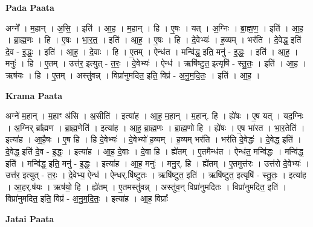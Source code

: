 \documentclass[17pt]{extarticle}
\begin{document}
\textbf{Pada Paata} \newline

अग्ने᳚ । म॒हान् । अ॒सि॒ । इति॑ । आ॒ह॒ । म॒हान् । हि । ए॒षः । यत् । अ॒ग्निः । ब्रा॒ह्म॒ण॒ । इति॑ । आ॒ह॒ । ब्रा॒ह्म॒णः । हि । ए॒षः । भा॒र॒त॒ । इति॑ । आ॒ह॒ । ए॒षः । हि । दे॒वेभ्यः॑ । ह॒व्यम् । भर॑ति । दे॒वेद्ध॒ इति॑ दे॒व - इ॒द्धः॒ । इति॑ । आ॒ह॒ । दे॒वाः । हि । ए॒तम् । ऐन्ध॑त । मन्वि॑द्ध॒ इति॒ मनु॑ - इ॒द्धः॒ । इति॑ । आ॒ह॒ । मनुः॑ । हि । ए॒तम् । उत्त॑र॒ इत्युत् - त॒रः॒ । दे॒वेभ्यः॑ । ऐन्ध॑ । ऋषि॑ष्टुत॒ इत्यृषि॑ - स्तु॒तः॒ । इति॑ । आ॒ह॒ । ऋष॑यः । हि । ए॒तम् । अस्तु॑वन्न् । विप्रा॑नुमदित॒ इति॒ विप्र॑ - अ॒नु॒म॒दि॒तः॒ । इति॑ । आ॒ह॒ ।  \newline


\textbf{Krama Paata} \newline

अग्ने॑ म॒हान् । म॒हाꣳ अ॑सि । अ॒सीति॑ । इत्या॑ह । आ॒ह॒ म॒हान् । म॒हान्. हि । ह्ये॑षः । ए॒ष यत् । यद॒ग्निः । अ॒ग्निर् ब्रा᳚ह्मण । ब्रा॒ह्म॒णेति॑ । इत्या॑ह । आ॒ह॒ ब्रा॒ह्म॒णः । ब्रा॒ह्म॒णो हि । ह्ये॑षः । ए॒ष भा॑रत । भा॒र॒तेति॑ । इत्या॑ह । आ॒है॒षः । ए॒ष हि । हि दे॒वेभ्यः॑ । दे॒वेभ्यो॑ ह॒व्यम् । ह॒व्यम् भर॑ति । भर॑ति दे॒वेद्धः॑ । दे॒वेद्ध॒ इति॑ । दे॒वेद्ध॒ इति॑ दे॒व - इ॒द्धः॒ । इत्या॑ह । आ॒ह॒ दे॒वाः । दे॒वा हि । ह्ये॑तम् । ए॒तमैन्ध॑त । ऐन्ध॑त॒ मन्वि॑द्धः । मन्वि॑द्ध॒ इति॑ । मन्वि॑द्ध॒ इति॒ मनु॑ - इ॒द्धः॒ । इत्या॑ह । आ॒ह॒ मनुः॑ । मनु॒र्. हि । ह्ये॑तम् । ए॒तमुत्त॑रः । उत्त॑रो दे॒वेभ्यः॑ । उत्त॑र॒ इत्युत् - त॒रः॒ । दे॒वेभ्य॒ ऐन्ध॑ । ऐन्धर्.षि॑ष्टुतः । ऋषि॑ष्टुत॒ इति॑ । ऋषि॑ष्टुत॒ इत्यृषि॑ - स्तु॒तः॒ । इत्या॑ह । आ॒हर्.ष॑यः । ऋष॑यो॒ हि । ह्ये॑तम् । ए॒तमस्तु॑वन्न् । अस्तु॑व॒न् विप्रा॑नुमदितः । विप्रा॑नुमदित॒ इति॑ । विप्रा॑नुमदित॒ इति॒ विप्र॑ - अ॒नु॒म॒दि॒तः॒ । इत्या॑ह । आ॒ह॒ विप्राः᳚ \newline

\textbf{Jatai Paata} \newline
\end{document}
